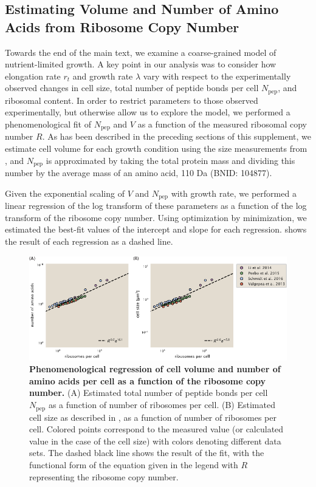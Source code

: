 \subsection{Estimating Volume and Number of Amino Acids from Ribosome Copy Number}
Towards the end of the main text, we examine a coarse-grained model of
nutrient-limited growth. A key point in our analysis was to consider  how
elongation rate $r_t$ and growth rate $\lambda$ vary with respect to the
experimentally observed changes in cell size, total number of peptide bonds per
cell  $N_\text{pep}$, and ribosomal content.  In order to restrict parameters
to those observed experimentally, but otherwise allow us to explore the
model, we performed a phenomenological fit of $N_\text{pep}$ and $V$ as a
function of the measured ribosomal copy number $R$. As has been described in the
preceding sections of this supplement, we estimate cell volume for each growth
condition using the size measurements from \cite{si2017,si2019}, and
$N_\text{pep}$ is approximated by taking the total protein mass and dividing
this number by the average mass of an amino acid, 110 Da (BNID: 104877).

Given the  exponential scaling of $V$ and $N_\text{pep}$ with growth rate, we
performed a linear regression of the log transform of these parameters as a
function of the log transform of the ribosome copy number. Using optimization by
minimization, we estimated the best-fit values of the intercept and slope for
each regression.  shows the result of each regression as a dashed
line.

\begin{figure}
  \centering
    \includegraphics{SI_figs/figA5_log_log_regression_naa_vol.pdf}
    \caption{{\textbf{Phenomenological regression of cell volume and number of
    amino acids per cell as a function of the ribosome copy number.}
    (A) Estimated total number of peptide bonds per
    cell $N_\text{pep}$ as a function of number of ribosomes per cell.
    (B) Estimated cell size as described in , as a function of number of ribosomes per cell. Colored
    points correspond to the measured value (or calculated value in the case of
    the cell size) with colors denoting different data sets. The dashed black
    line shows the result of the fit, with the functional form of the equation
    given in the legend with $R$ representing the ribosome copy number.}
  }
  \label{fig:naa_v_fit}
\end{figure}
